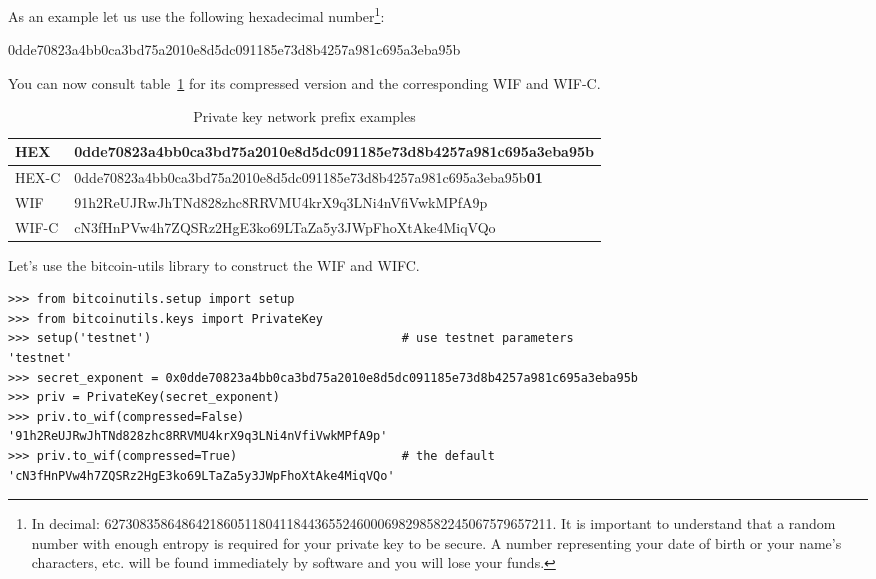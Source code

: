 As an example let us use the following hexadecimal number\footnote{In decimal: 6273083586486421860511804118443655246000698298582245067579657211. It is important to understand that a random number with enough entropy is required for your private key to be secure. A number representing your date of birth or your name’s characters, etc. will be found immediately by software and you will lose your funds.}:

\begin{emphbox}
0dde70823a4bb0ca3bd75a2010e8d5dc091185e73d8b4257a981c695a3eba95b
\end{emphbox}

You can now consult table~\ref{tab:private-key-example} for its compressed version and the corresponding WIF and WIF-C.

\begin{table}[h]
\centering
\begin{tabular}{ |l|l| }
\hline
HEX & 0dde70823a4bb0ca3bd75a2010e8d5dc091185e73d8b4257a981c695a3eba95b \\
\hline
HEX-C & 0dde70823a4bb0ca3bd75a2010e8d5dc091185e73d8b4257a981c695a3eba95b\textbf{01} \\
\hline
WIF & 91h2ReUJRwJhTNd828zhc8RRVMU4krX9q3LNi4nVfiVwkMPfA9p \\
\hline
WIF-C & cN3fHnPVw4h7ZQSRz2HgE3ko69LTaZa5y3JWpFhoXtAke4MiqVQo \\
\hline
\end{tabular}
\caption{Private key network prefix examples}
\label{tab:private-key-example}
\end{table}

Let's use the bitcoin-utils library to construct the WIF and WIFC.

\vspace{1em}
\begin{lstlisting}[style=Python,label={lst:construct-wif},caption={Example of creating WIF and WIFC using Python},captionpos=b]
>>> from bitcoinutils.setup import setup
>>> from bitcoinutils.keys import PrivateKey
>>> setup('testnet')                                   # use testnet parameters
'testnet'
>>> secret_exponent = 0x0dde70823a4bb0ca3bd75a2010e8d5dc091185e73d8b4257a981c695a3eba95b
>>> priv = PrivateKey(secret_exponent)
>>> priv.to_wif(compressed=False)
'91h2ReUJRwJhTNd828zhc8RRVMU4krX9q3LNi4nVfiVwkMPfA9p'
>>> priv.to_wif(compressed=True)                       # the default
'cN3fHnPVw4h7ZQSRz2HgE3ko69LTaZa5y3JWpFhoXtAke4MiqVQo'
\end{lstlisting}
\vspace{1em}

